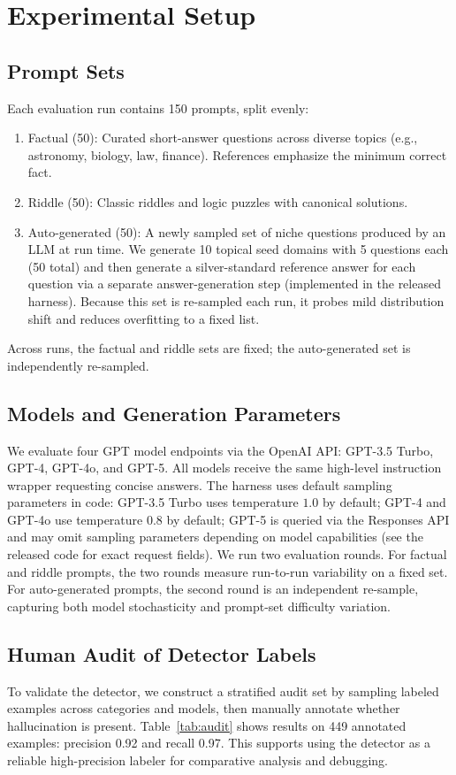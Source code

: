 \documentclass[11pt]{article}
\begin{document}
\section{Experimental Setup}
\subsection{Prompt Sets}
Each evaluation run contains 150 prompts, split evenly:
\begin{enumerate}
    \item Factual (50): Curated short-answer questions across diverse topics (e.g., astronomy, biology, law, finance). References emphasize the minimum correct fact.
    \item Riddle (50): Classic riddles and logic puzzles with canonical solutions.
    \item Auto-generated (50): A newly sampled set of niche questions produced by an LLM at run time. We generate 10 topical seed domains with 5 questions each (50 total) and then generate a silver-standard reference answer for each question via a separate answer-generation step (implemented in the released harness). Because this set is re-sampled each run, it probes mild distribution shift and reduces overfitting to a fixed list.
\end{enumerate}
Across runs, the factual and riddle sets are fixed; the auto-generated set is independently re-sampled.

\subsection{Models and Generation Parameters}
We evaluate four GPT model endpoints via the OpenAI API: GPT-3.5 Turbo, GPT-4, GPT-4o, and GPT-5. All models receive the same high-level instruction wrapper requesting concise answers. The harness uses default sampling parameters in code: GPT-3.5 Turbo uses temperature $1.0$ by default; GPT-4 and GPT-4o use temperature $0.8$ by default; GPT-5 is queried via the Responses API and may omit sampling parameters depending on model capabilities (see the released code for exact request fields). We run two evaluation rounds. For factual and riddle prompts, the two rounds measure run-to-run variability on a fixed set. For auto-generated prompts, the second round is an independent re-sample, capturing both model stochasticity and prompt-set difficulty variation.

\subsection{Human Audit of Detector Labels}
\label{sec:audit}
To validate the detector, we construct a stratified audit set by sampling labeled examples across categories and models, then manually annotate whether hallucination is present. Table~\ref{tab:audit} shows results on 449 annotated examples: precision 0.92 and recall 0.97. This supports using the detector as a reliable high-precision labeler for comparative analysis and debugging.
\end{document}
